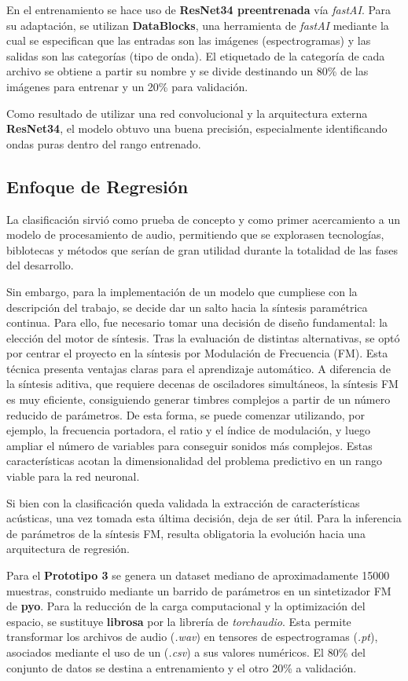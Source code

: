 En el entrenamiento se hace uso de \textbf{ResNet34 preentrenada} vía \textit{fastAI}. Para su adaptación, se utilizan \textbf{DataBlocks},
una herramienta de \textit{fastAI} mediante la cual se especifican que las entradas son las imágenes (espectrogramas) y las salidas
son las categorías (tipo de onda). El etiquetado de la categoría de cada archivo se obtiene a partir su nombre y se divide
destinando un 80\% de las imágenes para entrenar y un 20\% para validación.

Como resultado de utilizar una red convolucional y la arquitectura externa \textbf{ResNet34}, el modelo obtuvo una buena precisión, especialmente 
identificando ondas puras dentro del rango entrenado. 

\subsection{Enfoque de Regresión}
La clasificación sirvió como prueba de concepto y como primer acercamiento a un modelo de procesamiento de audio, permitiendo que se explorasen tecnologías, biblotecas y métodos que serían de gran utilidad durante la totalidad de las fases del desarrollo. 

Sin embargo, para la implementación de un modelo que cumpliese con la descripción del trabajo, se decide dar un salto hacia la síntesis paramétrica continua. Para ello, fue necesario tomar una decisión
de diseño fundamental: la elección del motor de síntesis. Tras la evaluación de distintas alternativas, 
se optó por centrar el proyecto en la síntesis por Modulación de Frecuencia (FM). Esta técnica presenta
ventajas claras para el aprendizaje automático. A diferencia de la síntesis aditiva, que requiere decenas
de osciladores simultáneos, la síntesis FM es muy eficiente, consiguiendo generar timbres complejos
a partir de un número reducido de parámetros. De esta forma, se puede comenzar utilizando, por ejemplo, 
la frecuencia portadora, el ratio y el índice de modulación, y luego ampliar el número de variables para
conseguir sonidos más complejos. Estas características acotan la dimensionalidad del problema predictivo en un rango viable para la red neuronal.   

Si bien con la clasificación queda validada la extracción de características acústicas, una vez tomada 
esta última decisión, deja de ser útil. Para la inferencia de parámetros de la síntesis FM, resulta 
obligatoria la evolución hacia una arquitectura de regresión.

Para el \textbf{Prototipo 3} se genera un dataset mediano de aproximadamente 15000 muestras, construido 
mediante un barrido de parámetros en un sintetizador FM de \textbf{pyo}. Para la reducción de la carga computacional
y la optimización del espacio, se sustituye \textbf{librosa} por la librería de \textit{torchaudio}. Esta permite
transformar los archivos de audio (\textit{.wav}) en tensores de espectrogramas (\textit{.pt}),
asociados mediante el uso de un (\textit{.csv}) a sus valores numéricos. El 80\% del conjunto de datos se destina 
a entrenamiento y el otro 20\% a validación.

